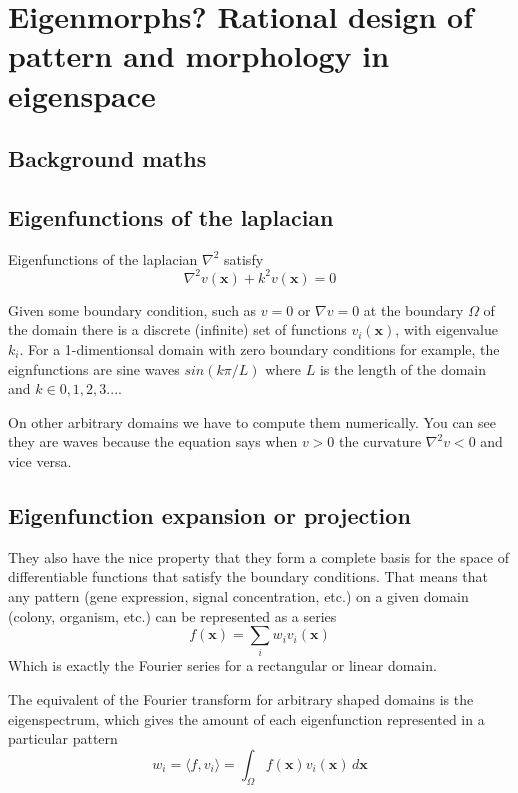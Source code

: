 \documentclass{report}
\renewcommand{\vec}[1]{\mathbf{#1}}
\begin{document}
 

\chapter{Eigenmorphs? Rational design of pattern and morphology in eigenspace}

\section{Background maths}
\section{Eigenfunctions of the laplacian}
Eigenfunctions of the laplacian $\nabla^2$ satisfy
\begin{equation}
\nabla^2 v(\vec{x}) + k^2 v(\vec{x}) = 0
\end{equation}

Given some boundary condition, such as $v=0$ or $\nabla v=0$ at the boundary $\Omega$ of the
domain there is a discrete (infinite) set of functions $v_i(\vec{x})$, with
eigenvalue $k_i$.  For a 1-dimentionsal domain with zero boundary
conditions for example, the eignfunctions are sine waves $sin(k\pi/L)$ where
$L$ is the length of the domain and $k \in {0,1,2,3...}$.

On other arbitrary domains we have to compute them numerically. You can see they
are waves because the equation says when $v>0$ the curvature $\nabla^2v<0$ and
vice versa.

\section{Eigenfunction expansion or projection}
They also have the nice property that they form a complete basis for the space
of differentiable functions that satisfy the boundary conditions. That means that
any pattern (gene expression, signal concentration, etc.) on a given domain
(colony, organism, etc.) can be represented as a series
\begin{equation}
f(\vec{x}) = \sum_{i} w_i v_i(\vec{x})
\end{equation}
Which is exactly the Fourier series for a rectangular or linear domain.

The equivalent of the Fourier transform for arbitrary shaped domains is the
eigenspectrum, which gives the amount of each eigenfunction represented in a
particular pattern
\begin{equation}
w_i = \langle f, v_i \rangle = \int_{\Omega} \! f(\vec{x}) v_i(\vec{x}) \, d\vec{x}
\end{equation}
\end{document}
